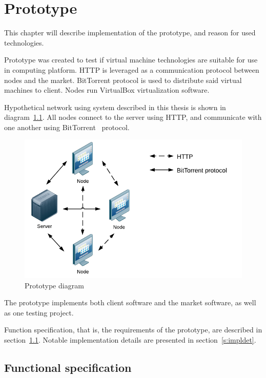 \chapter{Prototype}
\label{ch:prototype}

This chapter will describe implementation of the prototype, and reason for used technologies.

Prototype was created to test if virtual machine technologies are suitable for use in computing platform. HTTP is leveraged as a communication protocol between nodes and the market. BitTorrent protocol is used to distribute said virtual machines to client. Nodes run VirtualBox virtualization software.

Hypothetical network using system described in this thesis is shown in diagram~\ref{f:protomain}. All nodes connect to the server using HTTP, and communicate with one another using BitTorrent~\cite{cohen2008bittorrent} protocol.

\begin{figure}
\centering
\includegraphics{diagrams/PrototypeMain.pdf}
\caption{Prototype diagram}
\label{f:protomain}
\end{figure}

The prototype implements both client software and the market software, as well as one testing project.

Function specification, that is, the requirements of the prototype, are described in section~\ref{s:funcspec}. Notable implementation details are presented in section~\ref{s:impldet}.

\section{Functional specification}
\label{s:funcspec}

